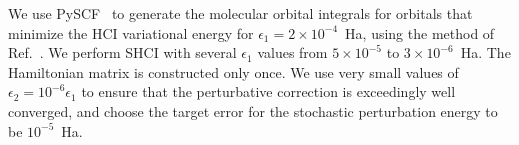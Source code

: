 We use PySCF~\cite{SunCha_etal_PySCF-ComMolSci-18} to generate the molecular orbital integrals for orbitals that minimize the HCI variational
energy for $\epsilon_1=2\times 10^{-4}$~Ha, using the method of Ref.~\cite{SmiMusHolSha-JCTC-17}.
We perform SHCI with several $\epsilon_1$ values from $5\times10^{-5}$ to $3\times10^{-6}$~Ha.
The Hamiltonian matrix is constructed only once.
We use very small values of $\epsilon_2 = 10^{-6} \epsilon_1$  to ensure that the perturbative correction is exceedingly well converged,
and choose the target error for the stochastic perturbation energy to be $10^{-5}$~Ha.


